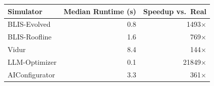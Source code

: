 \begin{tabular}{lrr}
\toprule
Simulator & Median Runtime (s) & Speedup vs.\ Real \\
\midrule
BLIS-Evolved & 0.8 & 1493$\times$ \\
BLIS-Roofline & 1.6 & 769$\times$ \\
Vidur & 8.4 & 144$\times$ \\
LLM-Optimizer & 0.1 & 21849$\times$ \\
AIConfigurator & 3.3 & 361$\times$ \\
\bottomrule
\end{tabular}
